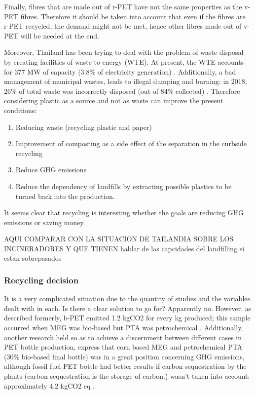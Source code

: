 \documentclass[twoside,a4paper,12pt]{report}
\begin{document}
Finally, fibres that are made out of r-PET have not the same properties as the v-PET fibres. Therefore it should be taken into account that even if the fibres are r-PET recycled, the demand might not be met, hence other fibres made out of v-PET will be needed at the end.

Moreover, Thailand has been trying to deal with the problem of waste disposal by creating facilities of waste to energy (WTE). At present, the WTE accounts for 377 MW of capacity (3.8\% of electricity generation) \cite{ERC_annreport2018}. 
Additionally, a bad management of municipal wastes, leads to illegal dumping and burning: in 2018, 26\% of total waste was incorrectly disposed (out of 84\% collected) \cite{PCDpolstate2019}. Therefore considering plastic as a source and not as waste can improve the present conditions:

\begin{enumerate}
    \item Reducing waste (recycling plastic and paper)
    \item Improvement of composting as a side effect of the separation in the curbside recycling
    \item Reduce GHG emissions
    \item Reduce the dependency of landfills by extracting possible plastics to be turned back into the production.
    
\end{enumerate}

It seems clear that recycling is interesting whether the goals are reducing GHG emissions or saving money.


AQUI COMPARAR CON LA SITUACION DE TAILANDIA SOBRE LOS INCINERADORES Y QUE TIENEN
hablar de las capcidades del landfilling  si estan sobrepasados


\subsubsection{Recycling decision}

It is a very complicated situation due to the quantity of studies and the variables dealt with in each. Is there a clear solution to go for? Apparently no. However, as described formerly, b-PET emitted 1.2 kgCO2 for every kg produced; this sample occurred when MEG was bio-based but PTA was petrochemical \cite{Shen2011}. Additionally, another research held so as to achieve a discernment between different cases in PET bottle production, express that corn based MEG and petrochemical PTA (30\% bio-based final bottle) was in a great position concerning GHG emissions, although fossil fuel PET bottle had better results if carbon sequestration by the plants (carbon sequestration is the storage of carbon.) wasn't taken into account: approximately 4.2 kgCO2 eq \cite{Hunter2016}.
\end{document}
